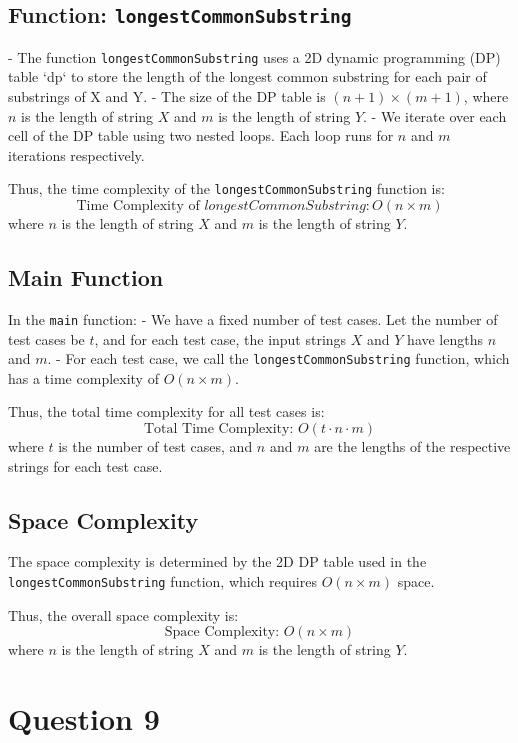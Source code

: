 \documentclass[a4paper,12pt]{report}
\begin{document}
\subsection*{Function: \texttt{longestCommonSubstring}}

- The function \texttt{longestCommonSubstring} uses a 2D dynamic programming (DP) table `dp` to store the length of the longest common substring for each pair of substrings of X and Y.
- The size of the DP table is \( (n+1) \times (m+1) \), where \(n\) is the length of string \(X\) and \(m\) is the length of string \(Y\).
- We iterate over each cell of the DP table using two nested loops. Each loop runs for \(n\) and \(m\) iterations respectively.

Thus, the time complexity of the \texttt{longestCommonSubstring} function is:
\[
\text{Time Complexity of } longestCommonSubstring: O(n \times m)
\]
where \(n\) is the length of string \(X\) and \(m\) is the length of string \(Y\).

\subsection*{Main Function}

In the \texttt{main} function:
- We have a fixed number of test cases. Let the number of test cases be \(t\), and for each test case, the input strings \(X\) and \(Y\) have lengths \(n\) and \(m\).
- For each test case, we call the \texttt{longestCommonSubstring} function, which has a time complexity of \(O(n \times m)\).

Thus, the total time complexity for all test cases is:
\[
\text{Total Time Complexity: } O(t \cdot n \cdot m)
\]
where \(t\) is the number of test cases, and \(n\) and \(m\) are the lengths of the respective strings for each test case.

\subsection*{Space Complexity}

The space complexity is determined by the 2D DP table used in the \texttt{longestCommonSubstring} function, which requires \(O(n \times m)\) space.

Thus, the overall space complexity is:
\[
\text{Space Complexity: } O(n \times m)
\]
where \(n\) is the length of string \(X\) and \(m\) is the length of string \(Y\).

\newpage
\section*{Question 9}
\end{document}
